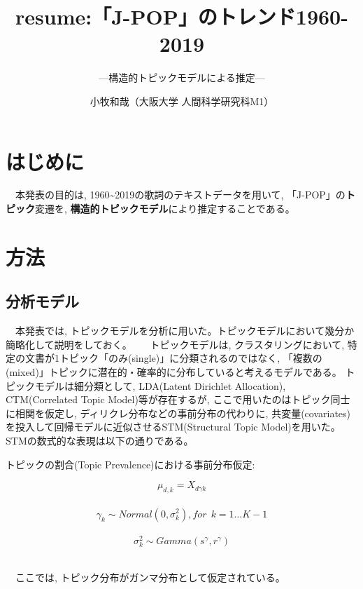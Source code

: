 \documentclass[
]{article}
\title{resume:「J-POP」のトレンド1960-2019}
\subtitle{---構造的トピックモデルによる推定---}
\author{小牧和哉（大阪大学 人間科学研究科M1）}
\date{}
\begin{document}
\maketitle

{
\setcounter{tocdepth}{2}
\tableofcontents
}
\hypertarget{ux306fux3058ux3081ux306b}{%
\section{はじめに}\label{ux306fux3058ux3081ux306b}}

　本発表の目的は,
1960\textasciitilde{}2019の歌詞のテキストデータを用いて,
「J-POP」の\textbf{トピック}変遷を,
\textbf{構造的トピックモデル}により推定することである。 　

\hypertarget{ux65b9ux6cd5}{%
\section{方法}\label{ux65b9ux6cd5}}

\hypertarget{ux5206ux6790ux30e2ux30c7ux30eb}{%
\subsection{分析モデル}\label{ux5206ux6790ux30e2ux30c7ux30eb}}

　本発表では,
トピックモデルを分析に用いた。トピックモデルにおいて幾分か簡略化して説明をしておく。　\newline
　トピックモデルは, クラスタリングにおいて,
特定の文書が1トピック「のみ(single)」に分類されるのではなく,
「複数の(mixed)」トピックに潜在的・確率的に分布していると考えるモデルである。
トピックモデルは細分類として, LDA(Latent Dirichlet Allocation),
CTM(Correlated Topic Model)等が存在するが,
ここで用いたのはトピック同士に相関を仮定し,
ディリクレ分布などの事前分布の代わりに,
共変量(covariates)を投入して回帰モデルに近似させるSTM(Structural Topic
Model)を用いた。　\newline 　STMの数式的な表現は以下の通りである。

トピックの割合(Topic Prevalence)における事前分布仮定:

\[μ_{d,k}=X_{dγk}\] 　\newline                                   　
\[γ_{k}\sim Normal (0,σ_k^2 ),    for ~ \ k=1…K-1\] 　\newline
\[σ_k^2\sim Gamma (s^γ,r^γ )\] 　\newline

　ここでは, トピック分布がガンマ分布として仮定されている。
\end{document}
